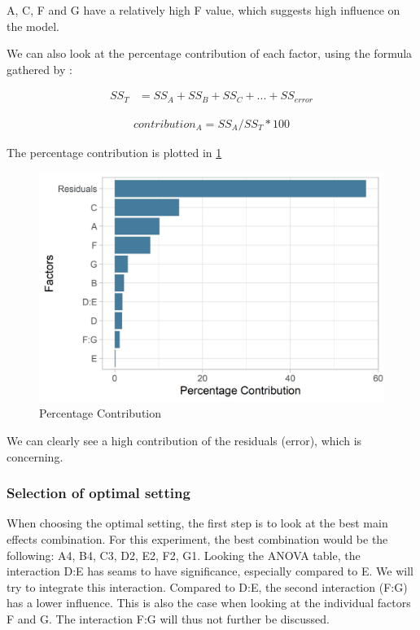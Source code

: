 A, C, F and G have a relatively high F value, which suggests high influence on the model. 


We can also look at the percentage contribution of each factor, using the formula gathered by \cite{yang_design_2009}:

\begin{equation} \label{equation:taguchi:ss_t}
	\begin{split}
		SS_T & = SS_A + SS_B + SS_C + ... + SS_{error}
	\end{split}
\end{equation}

\begin{equation} \label{equation:taguchi:contribution}
	\begin{split}
		contribution_A = SS_A / SS_T * 100
	\end{split}
\end{equation}

The percentage contribution is plotted in \ref{figure:taguchi:percentage_contribution}
\begin{figure}[ht] 
	\label{figure:taguchi:percentage_contribution}
	\includegraphics[width=1\linewidth]{simulations/taguchi/plots/percentage_contribution}
	\caption{Percentage Contribution}
\end{figure}

We can clearly see a high contribution of the residuals (error), which is concerning. 

\subsubsection{Selection of optimal setting}
When choosing the optimal setting, the first step is to look at the best main effects combination. For this experiment, the best combination would be the following: A4, B4, C3, D2, E2, F2, G1.
Looking the ANOVA table, the interaction D:E has seams to have significance, especially compared to E. We will try to integrate this interaction. Compared to D:E, the second interaction (F:G) has a lower influence. This is also the case when looking at the individual factors F and G. The interaction F:G will thus not further be discussed.

